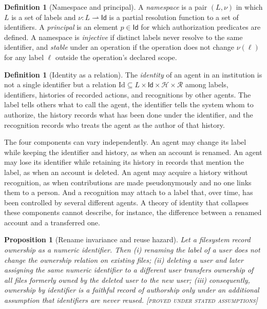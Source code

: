 \documentclass[11pt,twoside,openright]{book}
\theoremstyle{plain}
\newtheorem{proposition}[theorem]{Proposition}
\theoremstyle{definition}
\newtheorem{definition}[theorem]{Definition}
\theoremstyle{remark}
\newcommand{\Proved}{\textup{\textsc{[proved under stated assumptions]}}}
\begin{document}
\begin{definition}[Namespace and principal]\label{def:namespace}
A \emph{namespace} is a pair $(L,\nu)$ in which $L$ is a set of labels and $\nu:L\rightharpoonup \mathsf{Id}$ is a partial resolution function to a set of identifiers. A \emph{principal} is an element $p\in\mathsf{Id}$ for which authorization predicates are defined. A namespace is \emph{injective} if distinct labels never resolve to the same identifier, and \emph{stable} under an operation if the operation does not change $\nu(\ell)$ for any label $\ell$ outside the operation's declared scope.
\end{definition}

\begin{definition}[Identity as a relation]\label{def:identity}
The \emph{identity} of an agent in an institution is not a single identifier but a relation $\mathrm{Id}\subseteq L\times\mathsf{Id}\times\mathcal{H}\times\mathcal{R}$ among labels, identifiers, histories of recorded actions, and recognitions by other agents. The label tells others what to call the agent, the identifier tells the system whom to authorize, the history records what has been done under the identifier, and the recognition records who treats the agent as the author of that history.
\end{definition}

The four components can vary independently. An agent may change its label while keeping the identifier and history, as when an account is renamed. An agent may lose its identifier while retaining its history in records that mention the label, as when an account is deleted. An agent may acquire a history without recognition, as when contributions are made pseudonymously and no one links them to a person. And a recognition may attach to a label that, over time, has been controlled by several different agents. A theory of identity that collapses these components cannot describe, for instance, the difference between a renamed account and a transferred one.

\begin{proposition}[Rename invariance and reuse hazard]\label{prop:reuse}
Let a filesystem record ownership as a numeric identifier. Then (i) renaming the label of a user does not change the ownership relation on existing files; (ii) deleting a user and later assigning the same numeric identifier to a different user transfers ownership of all files formerly owned by the deleted user to the new user; (iii) consequently, ownership by identifier is a faithful record of authorship only under an additional assumption that identifiers are never reused.
\Proved{}
\end{proposition}
\end{document}
